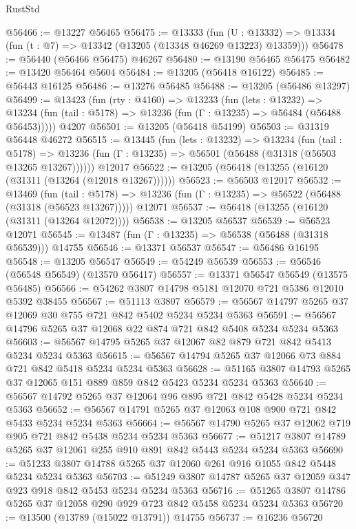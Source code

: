 \begin{lexlean}{RustStd}
\begin{coremodule}
@56466 := @13227 @56465
@56475 := @13333
    (fun (U : @13332) => @13334 (fun (t : @7) => @13342 (@13205 (@13348 @46269 @13223) @13359)))
@56478 := @56440 (@56466 @56475) @46267
@56480 := @13190 @56465 @56475
@56482 := @13420 @56464 @5604
@56484 := @13205 (@56418 @16122)
@56485 := @56443 @16125
@56486 := @13276 @56485
@56488 := @13205 (@56486 @13297)
@56499 := @13423
    (fun (rty : @4160) =>
    @13233
      (fun (lets : @13232) =>
      @13234 (fun (tail : @5178) => @13236 (fun (Γ : @13235) => @56484 (@56488 @56453)))))
    @4207
@56501 := @13205 (@56418 @54199)
@56503 := @31319 @56448 @46272
@56515 := @13445
    (fun (lets : @13232) =>
    @13234
      (fun (tail : @5178) =>
      @13236 (fun (Γ : @13235) => @56501 (@56488 (@31318 (@56503 @13265 @13267))))))
    @12017
@56522 := @13205 (@56418 (@13255 (@16120 (@31311 (@13264 (@12018 @13267))))))
@56523 := @56503 @12017
@56532 := @13469
    (fun (tail : @5178) => @13236 (fun (Γ : @13235) => @56522 (@56488 (@31318 (@56523 @13267)))))
    @12071
@56537 := @56418 (@13255 (@16120 (@31311 (@13264 @12072))))
@56538 := @13205 @56537
@56539 := @56523 @12071
@56545 := @13487 (fun (Γ : @13235) => @56538 (@56488 (@31318 @56539))) @14755
@56546 := @13371 @56537
@56547 := @56486 @16195
@56548 := @13205 @56547
@56549 := @54249 @56539
@56553 := @56546 (@56548 @56549) (@13570 @56417)
@56557 := @13371 @56547 @56549 (@13575 @56485)
@56566 := @54262 @3807 @14798 @5181 @12070 @721 @5386 @12010 @5392 @38455
@56567 := @51113 @3807
@56579 := @56567 @14797 @5265 @37 @12069 @30 @755 @721 @842 @5402 @5234 @5234 @5363
@56591 := @56567 @14796 @5265 @37 @12068 @22 @874 @721 @842 @5408 @5234 @5234 @5363
@56603 := @56567 @14795 @5265 @37 @12067 @82 @879 @721 @842 @5413 @5234 @5234 @5363
@56615 := @56567 @14794 @5265 @37 @12066 @73 @884 @721 @842 @5418 @5234 @5234 @5363
@56628 := @51165 @3807 @14793 @5265 @37 @12065 @151 @889 @859 @842 @5423 @5234 @5234 @5363
@56640 := @56567 @14792 @5265 @37 @12064 @96 @895 @721 @842 @5428 @5234 @5234 @5363
@56652 := @56567 @14791 @5265 @37 @12063 @108 @900 @721 @842 @5433 @5234 @5234 @5363
@56664 := @56567 @14790 @5265 @37 @12062 @719 @905 @721 @842 @5438 @5234 @5234 @5363
@56677 := @51217 @3807 @14789 @5265 @37 @12061 @255 @910 @891 @842 @5443 @5234 @5234 @5363
@56690 := @51233 @3807 @14788 @5265 @37 @12060 @261 @916 @1055 @842 @5448 @5234 @5234 @5363
@56703 := @51249 @3807 @14787 @5265 @37 @12059 @347 @923 @918 @842 @5453 @5234 @5234 @5363
@56716 := @51265 @3807 @14786 @5265 @37 @12058 @290 @929 @723 @842 @5458 @5234 @5234 @5363
@56720 := @13500 (@13789 (@15022 @13791)) @14755
@56737 := @16236
    @56720

\end{coremodule}
\end{lexlean}
